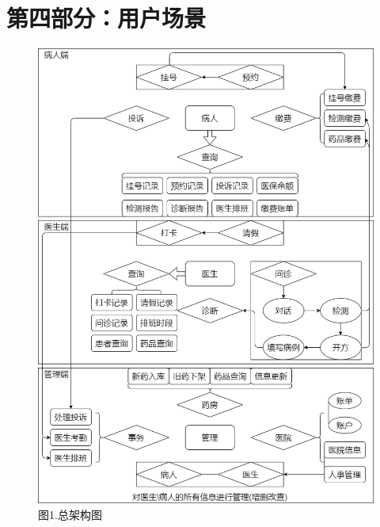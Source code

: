 \documentclass[24pt,a4paper]{article}%
\begin{document}
\section*{\songti 第四部分：用户场景}
\begin{figure}[H]
    \centering
    \includegraphics[width=1\textwidth]{image/architecture.png}
    \caption*{图1.总架构图}
\end{figure}
\end{document}
